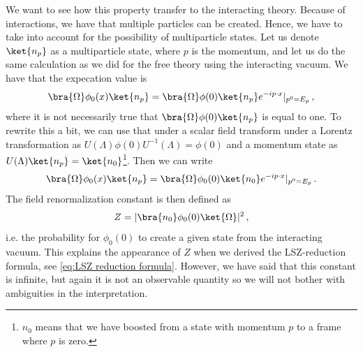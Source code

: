 We want to see how this property transfer to the interacting theory. Because of interactions, we have that multiple particles can be created. Hence, we have to take into account for the possibility of multiparticle states. Let us denote $\ket{n_{p}}$ as a multiparticle state, where $p$ is the momentum, and let us do the same calculation as we did for the free theory using the interacting vacuum. We have that the expecation value is
\begin{align}
    \bra{\Omega}\phi_{0}(x)\ket{n_{p}}=\bra{\Omega}\phi(0)\ket{n_p}e^{-ip\cdot x}|_{p^{0}=E_{p}}\,,
\end{align}
where it is not necessarily true that $\bra{\Omega}\phi(0)\ket{n_p}$ is equal to one. To rewrite this a bit, we can use that under a scalar field transform under a Lorentz transformation as $U(\Lambda)\phi(0)U^{-1}(\Lambda)=\phi(0)$ and a momentum state as $U(\Lambda)\ket{n_{p}}=\ket{n_0}$\footnote{$n_{0}$ means that we have boosted from a state with momentum $p$ to a frame where $p$ is zero.}. Then we can write
\begin{align}
    \bra{\Omega}\phi_{0}(x)\ket{n_{p}}=\bra{\Omega}\phi_{0}(0)\ket{n_0}e^{-ip\cdot x}|_{p^{0}=E_{p}}\,.
\end{align}
The field renormalization constant is then defined as
\begin{align}
    Z=|\bra{n_0}\phi_{0}(0)\ket{\Omega}|^{2}\,,
\end{align}
i.e. the probability for $\phi_{0}(0)$ to create a given state from the interacting vacuum. This explains the appearance of $Z$ when we derived the LSZ-reduction formula, see \cref{eq:LSZ reduction formula}. However, we have said that this constant is infinite, but again it is not an observable quantity so we will not bother with ambiguities in the interpretation.

